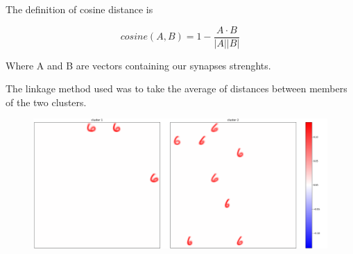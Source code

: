 \documentclass[a4paper]{report}
\begin{document}
The definition of cosine distance is

\begin{equation}
    cosine(A,B) = 1 - \frac{A \cdot B}{|A||B|}
\end{equation}

Where A and B are vectors containing our synapses strenghts.

The linkage method used was to take the average of distances between members of the two clusters.

\begin{figure} [H]
    \centering
    \includegraphics [width=\textwidth ] {c/c/1.png}
    \caption{}
\end{figure}
\end{document}
